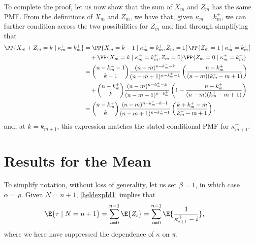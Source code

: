 To complete the proof, let us now show that the sum of $X_m$ and $Z_m$ has the same PMF. From the definitions of $X_m$ and $Z_m$, we have that, given $\kappa_m^+ = k_m^+$, we can further condition across the two possibilities for $Z_m$ and find through simplifying that
\begin{align}
\PP{X_m + Z_m = k \mid \kappa_m^+ = k_m^+}
&=
\PP{X_m = k - 1 \mid \kappa_m^+ = k_m^+, Z_m = 1}\PP{Z_m = 1 \mid \kappa_m^+ = k_m^+}
\nonumber
\\
&
\quad
+
\PP{X_m = k \mid \kappa_m^+ = k_m^+, Z_m = 0}\PP{Z_m = 0 \mid \kappa_m^+ = k_m^+}
\\
&=
{n - k_m^+ - 1 \choose k-1}\frac{(n-m)^{n-k_m^+-k}}{(n-m+1)^{n-k_m^+-1}}
\left(\frac{n-k_m^+}{(n-m)(k_m^+ - m + 1)} \right)
\nonumber
\\
&
\quad
+
{n - k_m^+ \choose k}\frac{(n-m)^{n-k_m^+-k}}{(n-m+1)^{n-k_m^+}}
\left(1- \frac{n-k_m^+}{(n-m)(k_m^+ - m + 1)} \right)
\\
&=
{n - k_m^+ \choose k}\frac{(n-m)^{n-k_m^+-k-1}}{(n-m+1)^{n-k_m^+-1}}
\left(
\frac{k
+
k_m^+
- 
m }{k_m^+-m+1}
\right)
,
\end{align}
and, at $k = k_{m+1}$, this expression matches the stated conditional PMF for $\kappa_{m+1}^+$.
\hfill\Halmos\endproof

\section{Results for the Mean}


To simplify notation, without loss of generality, let us set $\beta = 1$, in which case $\alpha = \rho$. Given $N = n+1$, \eqref{heldexpId1}  implies that
\begin{align}
\E{\tau \mid N = n + 1}
&=
\sum_{i=0}^{n-1}\E{Z_i}
=
\sum_{i=0}^{n-1}\E{\frac{1}{\kappa_{i+1}^+ - i}}
,
\end{align}
where we here have suppressed the dependence of $\kappa$ on $\pi$. 


